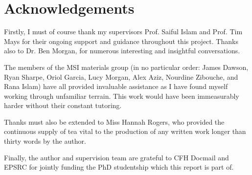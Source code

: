 \section*{Acknowledgements}
\thispagestyle{plain}
Firstly, I must of course thank my supervisors Prof. Saiful Islam and Prof. Tim Mays for their ongoing support and guidance throughout this project.
Thanks also to Dr. Ben Morgan, for numerous interesting and insightful conversations.

The members of the MSI materials group (in no particular order: James Dawson, Ryan Sharpe, Oriol Garcia, Lucy Morgan, Alex Aziz, Nourdine Zibouche, and Rana Islam) have all provided invaluable assistance as I have found myself working through unfamiliar terrain. 
This work would have been immeasurably harder without their constant tutoring.

Thanks must also be extended to Miss Hannah Rogers, who provided the continuous supply of tea vital to the production of any written work longer than thirty words by the author.

Finally, the author and supervision team are grateful to CFH Docmail and EPSRC for jointly funding the PhD studentship which this report is part of.